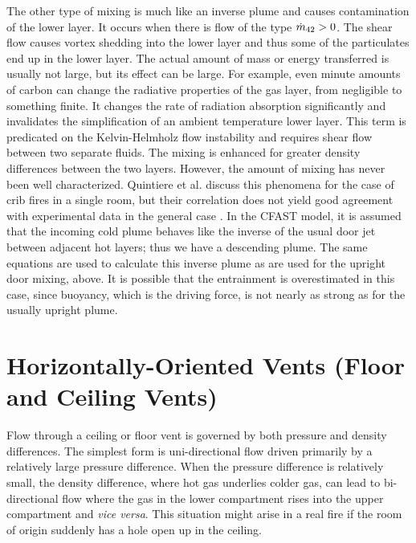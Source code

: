 The other type of mixing is much like an inverse plume and causes contamination of the lower layer.  It occurs when there is flow of the type $\dot{m}_{42} > 0$.  The shear flow causes vortex shedding into the lower layer and thus some of the particulates end up in the lower layer.  The actual amount of mass or energy transferred is usually not large, but its effect can be large.  For example, even minute amounts of carbon can change the radiative properties of the gas layer, from negligible to something finite.  It changes the rate of radiation absorption significantly and invalidates the simplification of an ambient temperature lower layer.  This term is predicated on the Kelvin-Helmholz flow instability and requires shear flow between two separate fluids.  The mixing is enhanced for greater density differences between the two layers. However, the amount of mixing has never been well characterized. Quintiere et al. \cite{Quintiere:1984} discuss this phenomena for the case of crib fires in a single room, but their correlation does not yield good agreement with experimental data in the general case \cite{Quintiere:1981}.  In the CFAST model, it is assumed that the incoming cold plume behaves like the inverse of the usual door jet between adjacent hot layers; thus we have a descending plume.  The same equations are used to calculate this inverse plume as are used for the upright door mixing, above. It is possible that the entrainment is overestimated in this case, since buoyancy, which is the driving force, is not nearly as strong as for the usually upright plume.

\section{Horizontally-Oriented Vents (Floor and Ceiling Vents)}

Flow through a ceiling or floor vent is governed by both pressure and density differences. The simplest form is uni-directional flow driven primarily by a relatively large pressure difference. When the pressure difference is relatively small, the density difference, where hot gas underlies colder gas, can lead to bi-directional flow where the gas in the lower compartment rises into the upper compartment and {\em vice versa}.  This situation might arise in a real fire if the room of origin suddenly has a hole open up in the ceiling.

